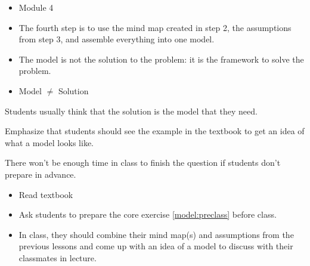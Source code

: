 \begin{lesson}

	\begin{itemize}
		\item Module 4
	\end{itemize}

	\begin{itemize}
		\item The fourth step is to use the mind map created in step 2, the assumptions from step 3, and assemble everything into one model.
		
		\item The model is not the solution to the problem: it is the framework to solve the problem. 
	\end{itemize}
	


\begin{annotation}
\begin{notes}
	\begin{itemize}
	\item Model $\neq$ Solution
	\end{itemize}
\end{notes}
\end{annotation}
Students usually think that the solution is the model that they need.

Emphasize that students should see the example in the textbook to get an idea of what a model looks like.

\begin{annotation}
\begin{notes}
	There won't be enough time in class to finish the question if students don't prepare in advance.
\end{notes}	
\end{annotation}

\begin{itemize}
	\item Read textbook
	\item Ask students to prepare the core exercise \ref{model:preclass} before class.

	\item In class, they should combine their mind map(s) and assumptions from the previous lessons and come up with an idea of a model to discuss with their classmates in lecture.

\end{itemize}


\end{lesson}
